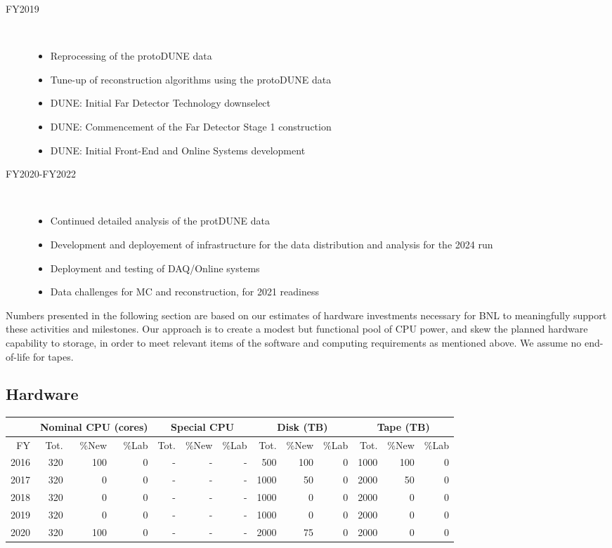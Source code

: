 \documentclass[pdftex,12pt,letter]{article}
\begin{document}
\begin{description}
\item[FY2019] \
\begin{itemize}
\item Reprocessing of the protoDUNE data
\item Tune-up of reconstruction algorithms using the protoDUNE data
\item DUNE: Initial Far Detector Technology downselect
\item DUNE: Commencement of the Far Detector Stage 1 construction
\item DUNE: Initial Front-End and Online Systems development
\end{itemize}

\item[FY2020-FY2022] \
\begin{itemize}
\item Continued detailed analysis of the protDUNE data
\item Development and deployement of infrastructure for the data distribution and analysis for the 2024 run
\item Deployment and testing of DAQ/Online systems
\item Data challenges for MC and reconstruction, for 2021 readiness
\end{itemize}
\end{description}

\noindent Numbers presented in the following section are based on our
estimates of hardware investments necessary for BNL to meaningfully
support these activities and milestones. 
Our approach is to create a modest but functional pool of CPU power,
and skew the planned hardware capability to storage, in order to meet
relevant items of the software and computing requirements as mentioned
above.  We assume no end-of-life for tapes.

\subsection{Hardware}

\begin{tabular}[h]{|r || r|r|r || r|r|r || r|r|r || r|r|r ||}
  \hline
   & \multicolumn{3}{c||}{Nominal CPU (cores)} & \multicolumn{3}{c||}{Special CPU} & \multicolumn{3}{c||}{Disk (TB)} & \multicolumn{3}{c||}{Tape (TB)} \\
   \hline
  FY & Tot. & \%New & \%Lab & Tot. & \%New & \%Lab & Tot. & \%New & \%Lab & Tot. & \%New & \%Lab \\
  \hline
  2016  &  320 &  100   & 0 & - & - & - & 500 & 100 & 0 & 1000 & 100 &  0 \\
  \hline
  2017 &  320 &   0     & 0 & - & - & - & 1000  & 50 & 0 & 2000 & 50    &  0 \\
  \hline
  2018 &  320 &   0     & 0 & - & - & - & 1000  & 0   & 0 & 2000 & 0      &  0 \\
  \hline
  2019  &  320 &  0    & 0 & - & - & - & 1000  &  0 & 0 & 2000 & 0     &  0 \\
  \hline
  2020 &  320 &  100     & 0 & - & - & - & 2000  & 75   & 0 & 2000 & 0    &  0 \\
  \hline
\end{tabular}
\end{document}
